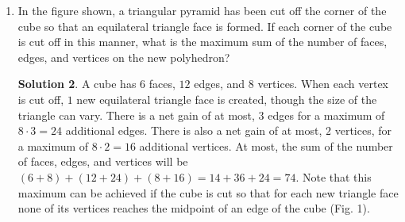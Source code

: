 \documentclass{article}
\theoremstyle{definition}
\newtheorem*{solution}{Solution}
\begin{document}
\begin{multicols}{2}
\begin{enumerate}
            What is the ratio of the volume of the cube to that of the sphere?
            Express your answer as a common fraction in terms of $\pi$.
            \begin{solution}
                The diameter of the sphere is equal to the side length $s$ of the cube.
                The volume of the cube $s^3$, and the volume of the sphere is $\frac{s^3}{\frac{\pi s^3}{6}} = \frac{6}{\pi}$.
                Note that because the sphere is inside the cube, the ratio has to be greater than $1$, of course.
                It is interesting that the ratio is almost $2$ (because $\pi \approx 3.1$), meaning the sphere takes up only a little more than half the space inside the cube.
            \end{solution}
        \item In the figure shown, a triangular pyramid has been cut off the corner of the cube so that an equilateral triangle face is formed.
            If each corner of the cube is cut off in this manner, what is the maximum sum of the number of faces, edges, and vertices on the new polyhedron?
            \begin{center}
            \end{center}
            \begin{solution}
                A cube has $6$ faces, $12$ edges, and $8$ vertices. When each vertex is cut off, $1$ new equilateral triangle face is created, though the size of the triangle can vary.
                There is a net gain of at most, $3$ edges for a maximum of $8 \cdot 3 = 24$ additional edges.
                There is also a net gain of at most, $2$ vertices, for a maximum of $8 \cdot 2 = 16$ additional vertices.
                At most, the sum of the number of faces, edges, and vertices will be $(6 + 8) + (12 + 24) + (8 + 16) = 14 + 36 +24 = 74$.
                Note that this maximum can be achieved if the cube is cut so that for each new triangle face none of its vertices reaches the midpoint of an edge of the cube (Fig. 1).

\end{solution}
\end{enumerate}
\end{multicols}
\end{document}
